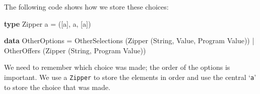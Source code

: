 \documentclass[runningheads,plain]{llncs}
\providecommand{\tightlist}{%
  \setlength{\itemsep}{0pt}\setlength{\parskip}{0pt}}
\newenvironment{Shaded}{}{}
\newcommand{\KeywordTok}[1]{\textcolor[rgb]{0.00,0.44,0.13}{\textbf{#1}}}
\newcommand{\DataTypeTok}[1]{\textcolor[rgb]{0.56,0.13,0.00}{#1}}
\newcommand{\FunctionTok}[1]{\textcolor[rgb]{0.02,0.16,0.49}{#1}}
\newcommand{\NormalTok}[1]{#1}
\begin{document}
\begin{enumerate}[1.]
  
   The following code shows how we store these choices:

\begin{Shaded}
\begin{Highlighting}[]
\KeywordTok{type} \DataTypeTok{Zipper}\NormalTok{ a }\FunctionTok{=}\NormalTok{ (}\NormalTok{[a], a, [a])}

\KeywordTok{data} \DataTypeTok{OtherOptions}
    \FunctionTok{=} \DataTypeTok{OtherSelections}\NormalTok{ (}\DataTypeTok{Zipper}\NormalTok{ (}\DataTypeTok{String}\NormalTok{, }\DataTypeTok{Value}\NormalTok{, }\DataTypeTok{Program} \DataTypeTok{Value}\NormalTok{))}
    \FunctionTok{|} \DataTypeTok{OtherOffers}\NormalTok{ (}\DataTypeTok{Zipper}\NormalTok{ (}\DataTypeTok{String}\NormalTok{, }\DataTypeTok{Program} \DataTypeTok{Value}\NormalTok{))}
\end{Highlighting}
\end{Shaded}

  We need to remember
  which choice was made; the order of the options is important. We
  use a \texttt{Zipper} to store the elements in order and use the
  central `\texttt{a}' to store the choice that was made.
\end{enumerate}


\end{document}
